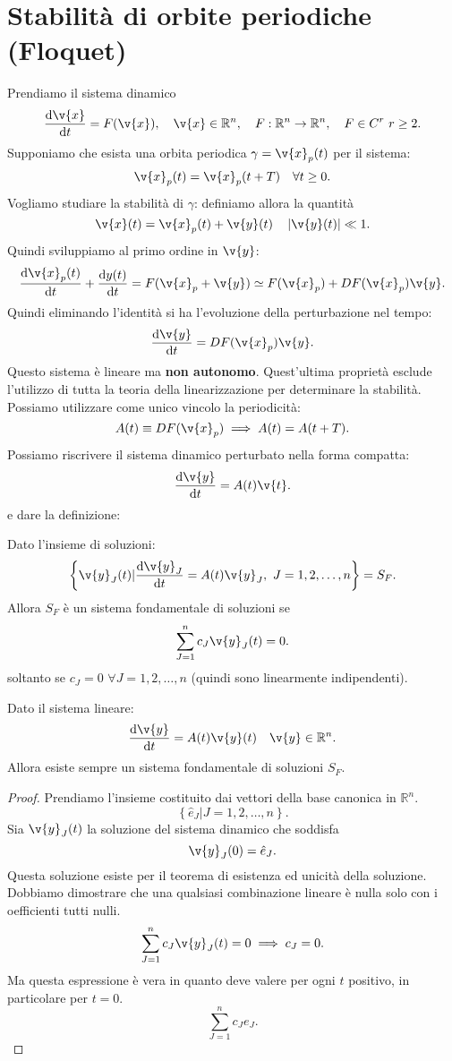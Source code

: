 \section{Stabilità di orbite periodiche (Floquet) }%
Prendiamo il sistema dinamico
\[
    \frac{\text{d} \v{x}}{\text{d} t} = F(\v{x}), \quad  \v{x}\in \mathbb{R}^n, \quad F:\mathbb{R}^n\to \mathbb{R}^n, \quad F\in C^r \ r\ge 2
.\] 
Supponiamo che esista una orbita periodica $\gamma = \v{x}_p(t) $ per il sistema:
\[
    \v{x}_p(t) = \v{x}_p(t+T) \quad  \forall t\ge 0
.\] 
Vogliamo studiare la stabilità di $\gamma$: definiamo allora la quantità
\[
    \v{x}(t) = \v{x}_p(t) + \v{y}(t) \quad  \left|\v{y}(t) \right|\ll 1
.\] 
Quindi sviluppiamo al primo ordine in $\v{y}$:
\[
    \frac{\text{d} \v{x}_p(t) }{\text{d} t} + \frac{\text{d} y(t) }{\text{d} t} = F(\v{x}_p+\v{y}) \simeq 
    F(\v{x}_p) + D F(\v{x}_p) \v{y}
.\] 
Quindi eliminando l'identità si ha l'evoluzione della perturbazione nel tempo:
\[
    \frac{\text{d} \v{y}}{\text{d} t} = DF(\v{x}_p) \v{y}
.\] 
Questo sistema è lineare ma \textbf{non autonomo}. Quest'ultima proprietà esclude l'utilizzo di tutta la teoria della linearizzazione per determinare la stabilità.
Possiamo utilizzare come unico vincolo la periodicità:
\[
    A(t) \equiv DF(\v{x}_p) \implies  A(t) = A(t+ T) 
.\] 
Possiamo riscrivere il sistema dinamico perturbato nella forma compatta:
\[
    \frac{\text{d} \v{y}}{\text{d} t} = A(t) \v{t}
.\] 
e dare la definizione:
\begin{defn}
    Dato l'insieme di soluzioni:
    \[
	\left\{\v{y}_J(t) | \frac{\text{d} \v{y}_J}{\text{d} t} = A(t) \v{y}_J, \ J = 1, 2, \ldots, n  \right\} = S_F
    .\] 
    Allora $S_F$ è un sistema fondamentale di soluzioni se 
    \[
	\sum_{J=1}^{n} c_J\v{y}_J(t) = 0
    .\] soltanto se $c_J = 0 $ $\forall J = 1, 2, \ldots, n$ (quindi sono linearmente indipendenti).
\end{defn}
\noindent
\begin{thm}
   Dato il sistema lineare:
   \[
       \frac{\text{d} \v{y}}{\text{d} t} = A(t) \v{y }(t) \quad  \v{y}\in \mathbb{R}^n
   .\] Allora esiste sempre un sistema fondamentale di soluzioni $S_F$.
\end{thm}
\noindent
\begin{proof}
    Prendiamo l'insieme costituito dai vettori della base canonica in $\mathbb{R}^n$.
    \[
        \left\{\hat{e}_J | J = 1, 2, \ldots, n\right\}
    .\] 
    Sia $\v{y}_J(t)$  la soluzione del sistema dinamico che soddisfa 
    \[
	\v{y}_J(0) = \hat{e}_J
    .\] Questa soluzione esiste per il teorema di esistenza ed unicità della soluzione.\\
    Dobbiamo dimostrare che una qualsiasi combinazione lineare è nulla solo con i oefficienti tutti nulli.
    \[
	\sum_{J=1}^{n} c_J\v{y}_J(t) = 0 \implies  c_J = 0
    .\] 
    Ma questa espressione è vera in quanto deve valere per ogni $t$ positivo, in particolare per $t = 0$. 
    \[
    \sum_{J = 1}^{n} c_J e_J
    .\] 
\end{proof}
